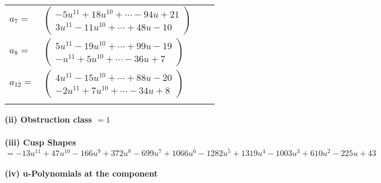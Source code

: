 \documentclass[1p]{elsarticle_modified}
\theoremstyle{definition}
\begin{document}
\begin{tabular}{m{7pt} m{180pt} m{7pt} m{180pt} }
\flushright $a_{7}=$&$\begin{pmatrix}-5 u^{11}+18 u^{10}+\cdots-94 u+21\\3 u^{11}-11 u^{10}+\cdots+48 u-10\end{pmatrix}$ \\
\flushright $a_{8}=$&$\begin{pmatrix}5 u^{11}-19 u^{10}+\cdots+99 u-19\\- u^{11}+5 u^{10}+\cdots-36 u+7\end{pmatrix}$ \\
\flushright $a_{12}=$&$\begin{pmatrix}4 u^{11}-15 u^{10}+\cdots+88 u-20\\-2 u^{11}+7 u^{10}+\cdots-34 u+8\end{pmatrix}$\\&\end{tabular}
\flushleft \textbf{(ii) Obstruction class $= 1$}\\~\\
\flushleft \textbf{(iii) Cusp Shapes $= -13 u^{11}+47 u^{10}-166 u^9+372 u^8-699 u^7+1066 u^6-1282 u^5+1319 u^4-1003 u^3+610 u^2-225 u+43$}\\~\\
\newpage\renewcommand{\arraystretch}{1}
\flushleft \textbf{(iv) u-Polynomials at the component}\newline \\
\end{document}
